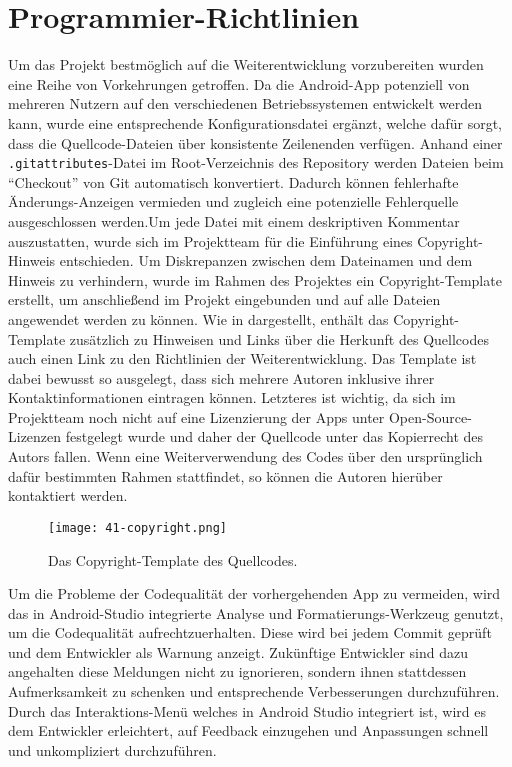 \newpage

\section{Programmier-Richtlinien}\label{sec:guidelines}

Um das Projekt bestmöglich auf die Weiterentwicklung vorzubereiten wurden eine Reihe von Vorkehrungen getroffen. 
\newline Da die Android-App potenziell von mehreren Nutzern auf den verschiedenen Betriebssystemen entwickelt werden kann, wurde eine entsprechende Konfigurationsdatei ergänzt, welche dafür sorgt, dass die Quellcode-Dateien über konsistente Zeilenenden verfügen. Anhand einer \texttt{.gitattributes}-Datei im Root-Verzeichnis des Repository werden Dateien beim \enquote{Checkout} von Git automatisch konvertiert. Dadurch können fehlerhafte Änderungs-Anzeigen vermieden und zugleich eine potenzielle Fehlerquelle ausgeschlossen werden.\newline Um jede Datei mit einem deskriptiven Kommentar auszustatten, wurde sich im Projektteam für die Einführung eines Copyright-Hinweis entschieden. Um Diskrepanzen zwischen dem Dateinamen und dem Hinweis zu verhindern, wurde im Rahmen des Projektes ein Copyright-Template erstellt, um anschließend im Projekt eingebunden und auf alle Dateien angewendet werden zu können. Wie in  dargestellt, enthält das Copyright-Template zusätzlich zu Hinweisen und Links über die Herkunft des Quellcodes auch einen Link zu den Richtlinien der Weiterentwicklung. Das Template ist dabei bewusst so ausgelegt, dass sich mehrere Autoren inklusive ihrer Kontaktinformationen eintragen können. Letzteres ist wichtig, da sich im Projektteam noch nicht auf eine Lizenzierung der Apps unter Open-Source-Lizenzen festgelegt wurde und daher der Quellcode unter das Kopierrecht des Autors fallen. Wenn eine Weiterverwendung des Codes über den ursprünglich dafür bestimmten Rahmen stattfindet, so können die Autoren hierüber kontaktiert werden.

\begin{figure}[H]
    \texttt{[image: 41-copyright.png]}
    \caption{Das Copyright-Template des Quellcodes.}\label{fig:copyright}
\end{figure}

Um die Probleme der Codequalität der vorhergehenden App zu vermeiden, wird das in Android-Studio integrierte Analyse und Formatierungs-Werkzeug genutzt, um die Codequalität aufrechtzuerhalten. Diese wird bei jedem Commit geprüft und dem Entwickler als Warnung anzeigt. Zukünftige Entwickler sind dazu angehalten diese Meldungen nicht zu ignorieren, sondern ihnen stattdessen Aufmerksamkeit zu schenken und entsprechende Verbesserungen durchzuführen. Durch das Interaktions-Menü welches in Android Studio integriert ist, wird es dem Entwickler erleichtert, auf Feedback einzugehen und Anpassungen schnell und unkompliziert durchzuführen.

